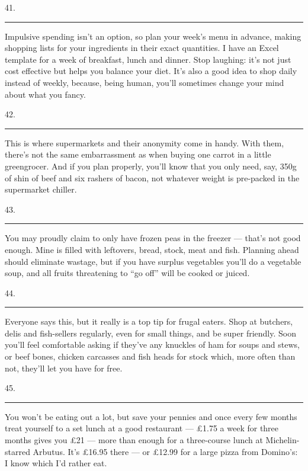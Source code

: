 \documentclass[UTF8,11pt]{ctexart}
\begin{document}
41. \par\noindent\rule{.95\linewidth}{.4pt}\par


Impulsive spending isn’t an option, so plan your week’s menu in advance, making shopping lists for your ingredients in their exact quantities. I have an Excel template for a week of breakfast, lunch and dinner. Stop laughing: it’s not just cost effective but helps you balance your diet. It’s also a good idea to shop daily instead of weekly, because, being human, you’ll sometimes change your mind about what you fancy.


42. \par\noindent\rule{.95\linewidth}{.4pt}\par


This is where supermarkets and their anonymity come in handy. With them, there’s not the same embarrassment as when buying one carrot in a little greengrocer. And if you plan properly, you’ll know that you only need, say, 350g of shin of beef and six rashers of bacon, not whatever weight is pre-packed in the supermarket chiller.


43. \par\noindent\rule{.95\linewidth}{.4pt}\par


You may proudly claim to only have frozen peas in the freezer — that’s not good enough. Mine is filled with leftovers, bread, stock, meat and fish. Planning ahead should eliminate wastage, but if you have surplus vegetables you’ll do a vegetable soup, and all fruits threatening to “go off” will be cooked or juiced.


44. \par\noindent\rule{.95\linewidth}{.4pt}\par


Everyone says this, but it really is a top tip for frugal eaters. Shop at butchers, delis and fish-sellers regularly, even for small things, and be super friendly. Soon you’ll feel comfortable asking if they’ve any knuckles of ham for soups and stews, or beef bones, chicken carcasses and fish heads for stock which, more often than not, they’ll let you have for free.


45. \par\noindent\rule{.95\linewidth}{.4pt}\par


You won’t be eating out a lot, but save your pennies and once every few months treat yourself to a set lunch at a good restaurant — £1.75 a week for three months gives you £21 — more than enough for a three-course lunch at Michelin-starred Arbutus. It’s £16.95 there — or £12.99 for a large pizza from Domino’s: I know which I’d rather eat.
\end{document}
